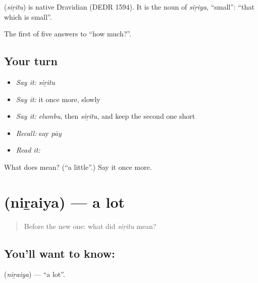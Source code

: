 \begin{cousinweb}
\textbf{} (\emph{siṟitu}) is native Dravidian (DEDR 1594). It is the noun of \emph{siṟiya}, \textquotedblleft{}small\textquotedblright{}: \textquotedblleft{}that which is small\textquotedblright{}.
\end{cousinweb}

\begin{grammarlens}[title={What you've built}]
The first of five answers to \textquotedblleft{}how much?\textquotedblright{}.
\end{grammarlens}

\subsection*{Your turn}
\begin{itemize}
\raggedright
  \item \emph{Say it:} \emph{siṟitu}
  \item \emph{Say it:} it once more, slowly
  \item \emph{Say it:} \emph{elumbu}, then \emph{siṟitu}, and keep the second one short
  \item \emph{Recall:} say \emph{pāy}
  \item \emph{Read it:} \textbf{}
\end{itemize}

\begin{tcolorbox}[breakable,colback=teal!4,colframe=teal!35!black,title={Before you move on}]
What does  mean? (\textquotedblleft{}a little\textquotedblright{}.) Say it once more.
\end{tcolorbox}
\section[\texorpdfstring{\ta{நிறைய} (niṟaiya)}{நிறைய (niṟaiya)}]{ (niṟaiya) — a lot}

\label{lesson:TA-C56-a-lot}



\begin{quote}
Before the new one: what did \emph{siṟitu} mean?
\end{quote}

\subsection*{You'll want to know: }
\textbf{} (\emph{niṟaiya}) — \textquotedblleft{}a lot\textquotedblright{}.

